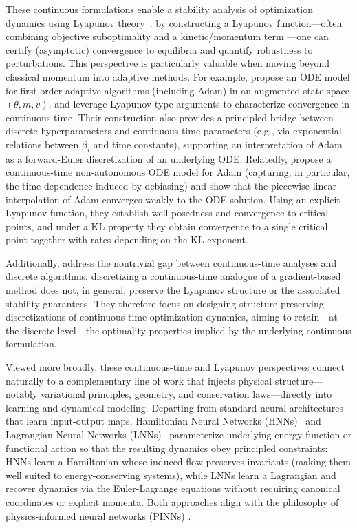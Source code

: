 \documentclass{article} %
\begin{document}
These continuous formulations enable a stability analysis of optimization dynamics using Lyapunov theory~\cite{gantmakher1970lectures,khalil2002}: by constructing a Lyapunov function---often combining objective suboptimality and a kinetic/momentum term \cite{Alvarez2000OnTM, ALVAREZ2002747, JMLRBelotto}---one can certify (asymptotic) convergence to equilibria and quantify robustness to perturbations. This perspective is particularly valuable when moving beyond classical momentum into adaptive methods. For example, \cite{JMLRBelotto} propose an ODE model for first-order adaptive algorithms (including Adam) in an augmented state space $(\theta,m,v)$, and leverage Lyapunov-type arguments to characterize convergence in continuous time. Their construction also provides a principled bridge between discrete hyperparameters and continuous-time parameters (e.g., via exponential relations between $\beta_i$ and time constants), supporting an interpretation of Adam as a forward-Euler discretization of an underlying ODE. Relatedly, \cite{Barakat2020} propose a continuous-time non-autonomous ODE model for Adam (capturing, in particular, the time-dependence induced by debiasing) and show that the piecewise-linear interpolation of Adam converges weakly to the ODE solution.  Using an explicit Lyapunov function, they establish well-posedness and convergence to critical points, and under a KL property they obtain convergence to a single critical point together with rates depending on the KL-exponent. 

Additionally, \cite{romero2022} address the nontrivial gap between continuous-time analyses and discrete algorithms: discretizing a continuous-time analogue of a gradient-based method does not, in general, preserve the Lyapunov structure or the associated stability guarantees. They therefore focus on designing structure-preserving discretizations of continuous-time optimization dynamics, aiming to retain---at the discrete level---the optimality properties implied by the underlying continuous formulation.

Viewed more broadly, these continuous-time and Lyapunov perspectives connect naturally to a complementary line of work that injects physical structure—notably variational principles, geometry, and conservation laws—directly into learning and dynamical modeling. Departing from standard neural architectures that learn input-output maps, Hamiltonian Neural Networks (HNNs)~\cite{greydanus2019hamiltonian} and Lagrangian Neural Networks (LNNs)~\cite{cranmer2020lagrangian} parameterize underlying energy function or functional action so that the resulting dynamics obey principled constraints: HNNs learn a Hamiltonian whose induced flow preserves invariants (making them well suited to energy-conserving systems), while LNNs learn a Lagrangian and recover dynamics via the Euler-Lagrange equations without requiring canonical coordinates or explicit momenta. Both approaches align with the philosophy of physics-informed neural networks (PINNs) \cite{PINNS}.
\end{document}
